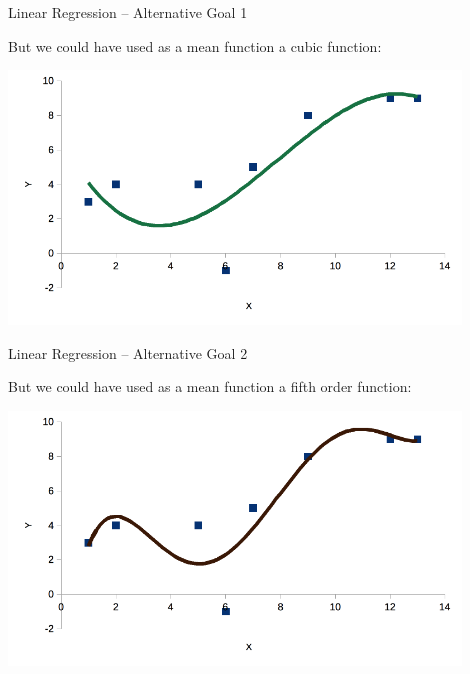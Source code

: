 \documentclass{beamer}
\begin{document}
\begin{frame}
{\centerline{Linear Regression -- Alternative Goal 1}}

But we could have used as a mean function a cubic function:

\begin{center}
\includegraphics[width=12cm]{P2023.AIBCCSS.FoundationsDataScience/LinearRegression_Degree3.png}
\end{center}

\end{frame}

\begin{frame}
{\centerline{Linear Regression -- Alternative Goal 2}}

But we could have used as a mean function a fifth order function:

\begin{center}
\includegraphics[width=12cm]{P2023.AIBCCSS.FoundationsDataScience/LinearRegression_Degree5.png}
\end{center}

\end{frame}
\end{document}
